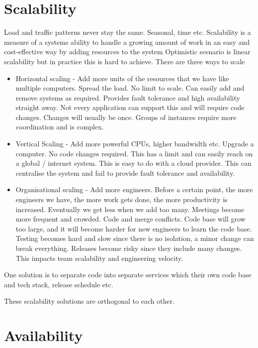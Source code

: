\section{Scalability}
Load and traffic patterns never stay the same.
Seasonal, time etc.
Scalability is a measure of a systems ability to handle a growing amount of work in an easy and cost-effective way by adding resources to the system
Optimistic scenario is linear scalability but in practice this is hard to achieve.
There are three ways to scale
\begin{itemize}
    \item Horizontal scaling - Add more units of the resources that we have like multiple computers.
    Spread the load.
    No limit to scale.
    Can easily add and remove systems as required.
    Provides fault tolerance and high availability straight away.
    Not every application can support this and will require code changes.
    Changes will usually be once.
    Groups of instances require more coordination and is complex.
    \item Vertical Scaling - Add more powerful CPUs, higher bandwidth etc.
    Upgrade a computer.
    No code changes required.
    This has a limit and can easily reach on a global / internet system.
    This is easy to do with a cloud provider.
    This can centralise the system and fail to provide fault tolerance and availability.
    \item Organisational scaling - Add more engineers.
    Before a certain point, the more engineers we have, the more work gets done, the more productivity is increased.
    Eventually we get less when we add too many.
    Meetings become more frequent and crowded.
    Code and merge conflicts.
    Code base will grow too large, and it will become harder for new engineers to learn the code base.
    Testing becomes hard and slow since there is no isolation, a minor change can break everything.
    Releases become risky since they include many changes.
    This impacts team scalability and engineering velocity.
\end{itemize}

One solution is to separate code into separate services which their own code base and tech stack, release schedule etc.

These scalability solutions are orthogonal to each other.

\section{Availability}

